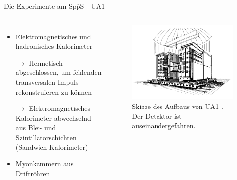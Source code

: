 \documentclass[aspectratio=1610, professionalfonts, 10pt]{beamer}
\begin{document}
\begin{frame}{Die Experimente am Sp$\overline{\text{p}}$S - UA1}
	\begin{columns}
				\begin{itemize}
					\setlength\itemsep{0.5em}
					\item Elektromagnetisches und hadronisches Kalorimeter
					\item[$\rightarrow$] Hermetisch abgeschlossen, um fehlenden transversalen Impuls rekonstruieren zu können
					\item[$\rightarrow$] Elektromagnetisches Kalorimeter abwechselnd aus Blei- und Szintillatorschichten (Sandwich-Kalorimeter)
					\item Myonkammern aus Driftröhren
				\end{itemize}
			\begin{figure}
	  			\centering
				\includegraphics[width=\linewidth]{Images/Screenshot_2018-12-04_16-44-02.png}
				\caption{Skizze des Aufbaus von UA1 \cite{doi:10.1142/9789814644150_0006}. Der Detektor ist auseinandergefahren. }
	  			\label{fig:sad}
			\end{figure}
	\end{columns}
\end{frame}
\end{document}
